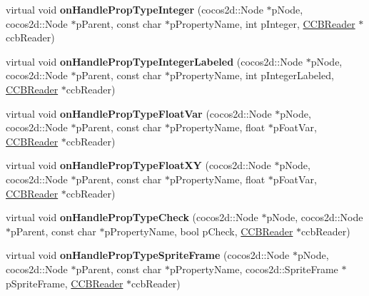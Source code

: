 \begin{DoxyCompactItemize}
\item 
\mbox{\label{classcocosbuilder_1_1NodeLoader_ac6845f206b506ecf38eff32611291566}} 
virtual void {\bfseries on\+Handle\+Prop\+Type\+Integer} (cocos2d\+::\+Node $\ast$p\+Node, cocos2d\+::\+Node $\ast$p\+Parent, const char $\ast$p\+Property\+Name, int p\+Integer, \hyperlink{classcocosbuilder_1_1CCBReader}{C\+C\+B\+Reader} $\ast$ccb\+Reader)
\item 
\mbox{\label{classcocosbuilder_1_1NodeLoader_ad6b5b5fada4a842962b640e6a67fb86b}} 
virtual void {\bfseries on\+Handle\+Prop\+Type\+Integer\+Labeled} (cocos2d\+::\+Node $\ast$p\+Node, cocos2d\+::\+Node $\ast$p\+Parent, const char $\ast$p\+Property\+Name, int p\+Integer\+Labeled, \hyperlink{classcocosbuilder_1_1CCBReader}{C\+C\+B\+Reader} $\ast$ccb\+Reader)
\item 
\mbox{\label{classcocosbuilder_1_1NodeLoader_a3079ac3c952d7ecb0fdd8cb26269c67b}} 
virtual void {\bfseries on\+Handle\+Prop\+Type\+Float\+Var} (cocos2d\+::\+Node $\ast$p\+Node, cocos2d\+::\+Node $\ast$p\+Parent, const char $\ast$p\+Property\+Name, float $\ast$p\+Foat\+Var, \hyperlink{classcocosbuilder_1_1CCBReader}{C\+C\+B\+Reader} $\ast$ccb\+Reader)
\item 
\mbox{\label{classcocosbuilder_1_1NodeLoader_ab1fd3223858986249dca8724ef68f509}} 
virtual void {\bfseries on\+Handle\+Prop\+Type\+Float\+XY} (cocos2d\+::\+Node $\ast$p\+Node, cocos2d\+::\+Node $\ast$p\+Parent, const char $\ast$p\+Property\+Name, float $\ast$p\+Foat\+Var, \hyperlink{classcocosbuilder_1_1CCBReader}{C\+C\+B\+Reader} $\ast$ccb\+Reader)
\item 
\mbox{\label{classcocosbuilder_1_1NodeLoader_a8ae8af9d4d0bd2a84c70a5fd442c8951}} 
virtual void {\bfseries on\+Handle\+Prop\+Type\+Check} (cocos2d\+::\+Node $\ast$p\+Node, cocos2d\+::\+Node $\ast$p\+Parent, const char $\ast$p\+Property\+Name, bool p\+Check, \hyperlink{classcocosbuilder_1_1CCBReader}{C\+C\+B\+Reader} $\ast$ccb\+Reader)
\item 
\mbox{\label{classcocosbuilder_1_1NodeLoader_aa95cc78ff14122c1b4ff1b2e4bfa5df4}} 
virtual void {\bfseries on\+Handle\+Prop\+Type\+Sprite\+Frame} (cocos2d\+::\+Node $\ast$p\+Node, cocos2d\+::\+Node $\ast$p\+Parent, const char $\ast$p\+Property\+Name, cocos2d\+::\+Sprite\+Frame $\ast$p\+Sprite\+Frame, \hyperlink{classcocosbuilder_1_1CCBReader}{C\+C\+B\+Reader} $\ast$ccb\+Reader)

\end{DoxyCompactItemize}
